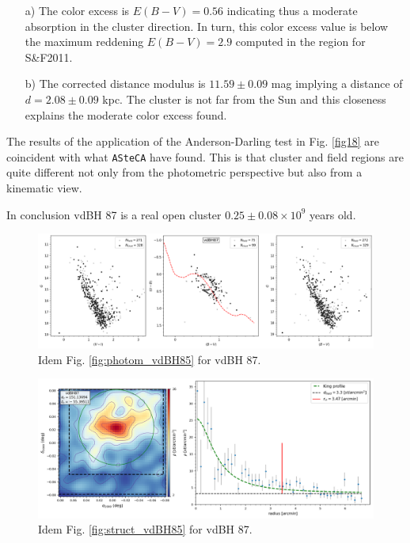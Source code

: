 \documentclass[draft]{aa}
\begin{document}
\begin{itemize}
\item [a)] The color excess is $E(B-V)=0.56$ indicating thus a moderate
    absorption in the cluster direction. In turn, this color excess value is
    below the maximum reddening $E(B-V)=2.9$ computed in the region for 
    S\&F2011.
\item [b)] The corrected distance modulus is $11.59\pm0.09$ mag implying a
distance of $d=2.08\pm0.09$ kpc. The cluster is not far from the Sun and
this closeness explains the moderate color excess found.
\end{itemize}

The results of the application of the Anderson-Darling test in Fig. \ref{fig18}
are coincident with what \texttt{ASteCA} have found. This is that cluster and
field regions are quite different not only from the photometric perspective but
also from a kinematic view.

In conclusion vdBH 87 is a real open cluster $0.25\pm0.08\times10^9$
years old.

\begin{figure}[ht]
    \centering
    \includegraphics[width=\hsize]{../figs/obs_vdBH87.png}
    \caption{Idem Fig. \ref{fig:photom_vdBH85} for vdBH 87.}
    \label{fig15}
\end{figure}

\begin{figure}[ht]
    \centering
    \includegraphics[width=\hsize]{../figs/dmap_vdbh87.png}
    \caption{Idem Fig. \ref{fig:struct_vdBH85} for vdBH 87.}
    \label{fig16}
\end{figure}
\end{document}
